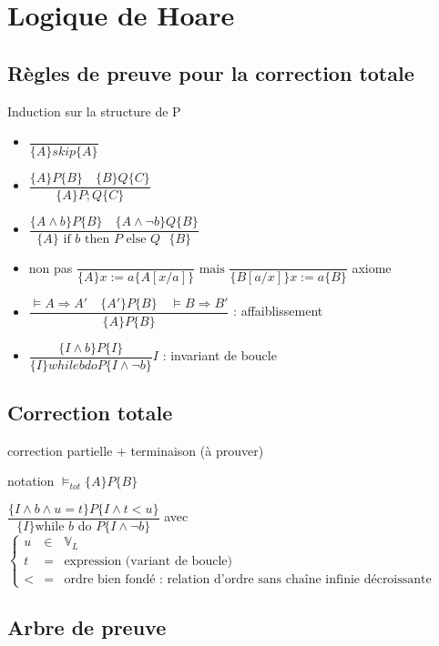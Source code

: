 \documentclass[10pt,a4paper]{article}
\newcommand{\Vs}{\mathbb{V}}
\begin{document}
\section{Logique de Hoare}
\subsection{Règles de preuve pour la correction totale}
Induction sur la structure de P
\begin{itemize}
 \item $\dfrac{}{\{A\}skip\{A\}}$\\
 \item $\dfrac{\{A\}P\{B\} \quad \{B\}Q\{C\}}{\{A\}P;Q\{C\}}$\\
 \item $\dfrac{\{A \wedge b\}P\{B\} \quad \{A \wedge \lnot b\}Q\{B\}}{\{A\}\text{ if $b$ then $P$ else $Q$ }\{B\}}$\\
 \item non pas $ \dfrac{}{\{A\}x := a\{A[x/a]\}}\text{ mais }\dfrac{}{\{B[a/x]\}x := a\{B\}}$ axiome\\
 \item $\dfrac{\models A \Rightarrow A' \quad \{A'\}P\{B\} \quad \models B \Rightarrow B'}{\{A\}P\{B\}}$ : affaiblissement\\
 \item $\dfrac{\{I \wedge b \}P\{I\}}{\{I\}while b do P\{I \wedge \lnot b\}} I$ : invariant de boucle\\
\end{itemize}

\subsection{Correction totale}
correction partielle + terminaison (à prouver)

notation $\models_{tot} \{A\}P\{B\}$

$\dfrac{ \{I \wedge b \wedge u = t\}P\{I \wedge t<u\}}{\{I\}\text{while $b$ do $P$}\{I \wedge \lnot b\}}$ avec 
$\left\{\begin{array}{lcl}
 u & \in&  \Vs_L\\
t & = & \text{expression (variant de boucle)}\\
< & =& \text{ordre bien fondé : relation d'ordre sans chaîne infinie décroissante}
\end{array}\right.$

\subsection{Arbre de preuve}
\end{document}
